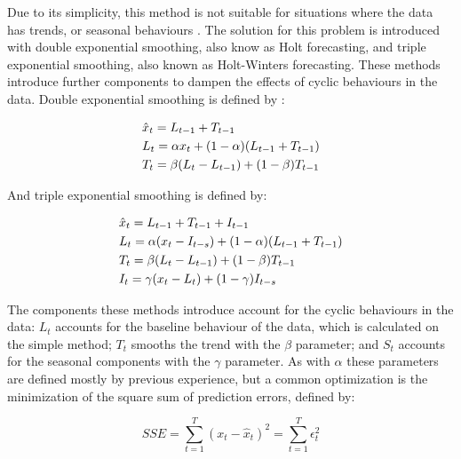 \par Due to its simplicity, this method is not suitable for situations where the data has trends, or seasonal behaviours \cite{kalekar_time_2004}. The solution for
this problem is introduced with double exponential smoothing, also know as Holt forecasting, and triple exponential smoothing, also known as Holt-Winters
forecasting. These methods introduce further components to dampen the effects of cyclic behaviours in the data. Double exponential smoothing is defined by
\cite{munz_traffic_2010} :

\begin {equation*}
\centering
\begin {split}
&\hat{x}_t = L_{t-1} + T_{t-1} \\
&L_t = \alpha x_t + (1-\alpha)(L_{t-1} + T_{t-1}) \\
&T_t = \beta (L_t - L_{t-1}) + (1-\beta)T_{t-1}
\end {split}
\label{eq:double_exp_smooth}
\end {equation*}

\par And triple exponential smoothing is defined by:

\begin {equation*}
\centering
\begin {split}
&\hat{x}_t = L_{t-1} + T_{t-1} + I_{t-1}\\
&L_t = \alpha (x_t - I_{t-s}) + (1-\alpha)(L_{t-1} + T_{t-1}) \\
&T_t = \beta (L_t - L_{t-1}) + (1-\beta)T_{t-1} \\
&I_t = \gamma (x_t - L_t) + (1-\gamma)I_{t-s}
\end {split}
\label{eq:triple_exp_smooth}
\end {equation*}

\par The components these methods introduce account for the cyclic behaviours in the data: $L_t$ accounts for the baseline behaviour of the data, which is 
calculated on the simple method; $T_t$ smooths the trend with the $\beta$ parameter; and $S_t$ accounts for the seasonal components with the $\gamma$ parameter.
As with $\alpha$ these parameters are defined mostly by previous experience, but a common optimization is the minimization of the square sum of prediction errors, 
defined by:

\begin {equation*} 
    \label{eq:sse}
    SSE = \sum_{t=1}^T{(x_t-\hat{x}_{t})^2} = \sum_{t=1}^T{\epsilon_t^2}
\end {equation*}

